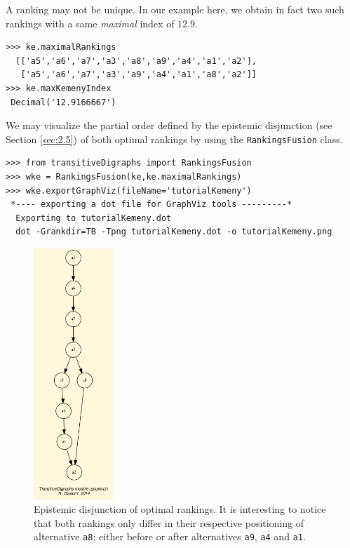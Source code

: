 A \Kemeny ranking may not be unique. In our example here, we obtain in fact two such \Kemeny rankings with a same \emph{maximal} \Kemeny index of $12.9$. 
\begin{lstlisting}[caption={Optimal \Kemeny rankings},label=list:8.8] >>> ke.maximalRankings
  [['a5','a6','a7','a3','a8','a9','a4','a1','a2'],
   ['a5','a6','a7','a3','a9','a4','a1','a8','a2']]
>>> ke.maxKemenyIndex
 Decimal('12.9166667')
\end{lstlisting}

We may visualize the partial order defined by the epistemic disjunction (see Section \ref{sec:2.5}) of both optimal \Kemeny rankings by using the \texttt{RankingsFusion} class.
\begin{lstlisting}[caption={Computing the epistemic disjunction of all optimal \Kemeny rankings},label=list:8.9]   
>>> from transitiveDigraphs import RankingsFusion
>>> wke = RankingsFusion(ke,ke.maximalRankings)
>>> wke.exportGraphViz(fileName='tutorialKemeny')
 *---- exporting a dot file for GraphViz tools ---------*
  Exporting to tutorialKemeny.dot
  dot -Grankdir=TB -Tpng tutorialKemeny.dot -o tutorialKemeny.png
\end{lstlisting}
\begin{figure}[h]
\sidecaption[t]
\includegraphics[width=3cm]{Figures/tutorialKemeny.png}
\caption{Epistemic disjunction of optimal \Kemeny rankings. It is interesting to notice that both \Kemeny rankings only differ in their respective positioning of alternative \texttt{a8}; either before or after alternatives \texttt{a9}, \texttt{a4} and \texttt{a1}. }
\label{fig:8.3}       %
\end{figure}

